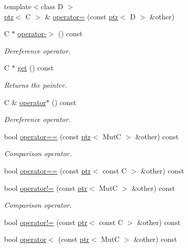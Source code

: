 \begin{DoxyCompactItemize}
{\footnotesize template$<$class D $>$ }\\\hyperlink{classdbo_1_1ptr}{ptr}$<$ C $>$ \& \hyperlink{classdbo_1_1ptr_a5391736647ac3d24efaad019805b42ca}{operator=} (const \hyperlink{classdbo_1_1ptr}{ptr}$<$ D $>$ \&other)
\item 
C $\ast$ \hyperlink{classdbo_1_1ptr_a19988f39645add72eed820fc754d78bb}{operator-\/$>$} () const 
\begin{DoxyCompactList}\small\item\em Dereference operator. \end{DoxyCompactList}\item 
C $\ast$ \hyperlink{classdbo_1_1ptr_ae05d3e079bd72edd92cb39d218ae6f7b}{get} () const 
\begin{DoxyCompactList}\small\item\em Returns the pointer. \end{DoxyCompactList}\item 
C \& \hyperlink{classdbo_1_1ptr_a5b61379bd3cc91221dd430b24a5cee01}{operator$\ast$} () const 
\begin{DoxyCompactList}\small\item\em Dereference operator. \end{DoxyCompactList}\item 
bool \hyperlink{classdbo_1_1ptr_a733dd776fa6437df42d43c658e9e2b46}{operator==} (const \hyperlink{classdbo_1_1ptr}{ptr}$<$ Mut\+C $>$ \&other) const 
\begin{DoxyCompactList}\small\item\em Comparison operator. \end{DoxyCompactList}\item 
bool \hyperlink{classdbo_1_1ptr_a53ffbe1fc2ff280ec1e51f07340afa59}{operator==} (const \hyperlink{classdbo_1_1ptr}{ptr}$<$ const C $>$ \&other) const 
\item 
bool \hyperlink{classdbo_1_1ptr_aeffa0731ad6db791543528ffc35b06ff}{operator!=} (const \hyperlink{classdbo_1_1ptr}{ptr}$<$ Mut\+C $>$ \&other) const 
\begin{DoxyCompactList}\small\item\em Comparison operator. \end{DoxyCompactList}\item 
bool \hyperlink{classdbo_1_1ptr_a8f75218dcf7602016bd05204de07bd1d}{operator!=} (const \hyperlink{classdbo_1_1ptr}{ptr}$<$ const C $>$ \&other) const 
\item 
bool \hyperlink{classdbo_1_1ptr_a352eff12b264f96f7fb9d8b99490ed0f}{operator$<$} (const \hyperlink{classdbo_1_1ptr}{ptr}$<$ Mut\+C $>$ \&other) const 

\end{DoxyCompactItemize}
